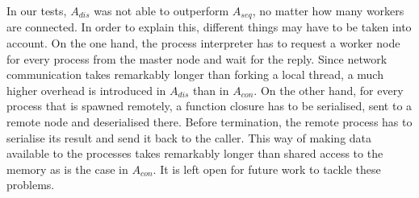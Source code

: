 In our tests, $A_{dis}$ was not able to outperform $A_{seq}$, no matter how many workers are connected. In order to explain this, different things may have to be taken into account. On the one hand, the process interpreter has to request a worker node for every process from the master node and wait for the reply. Since network communication takes remarkably longer than forking a local thread, a much higher overhead is introduced in $A_{dis}$ than in $A_{con}$. On the other hand, for every process that is spawned remotely, a function closure has to be serialised, sent to a remote node and deserialised there. Before termination, the remote process has to serialise its result and send it back to the caller. This way of making data available to the processes takes remarkably longer than shared access to the memory as is the case in $A_{con}$. It is left open for future work to tackle these problems.